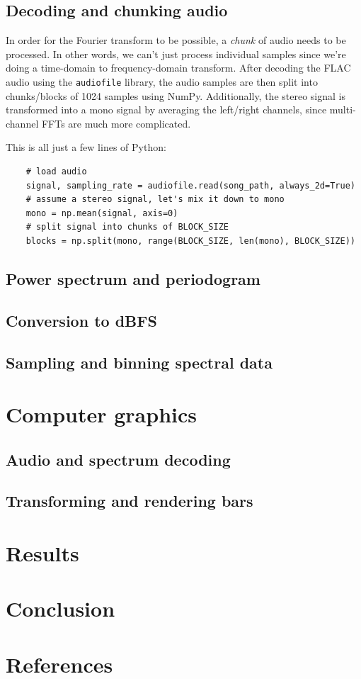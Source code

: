 \documentclass[11pt]{article}
\begin{document}
\subsection{Decoding and chunking audio}
In order for the Fourier transform to be possible, a \textit{chunk} of audio needs to be processed. In other
words, we can't just process individual samples since we're doing a time-domain to frequency-domain
transform. After decoding the FLAC audio using the \verb|audiofile| library, the audio samples are then split
into chunks/blocks of 1024 samples using NumPy. Additionally, the stereo signal is transformed into a mono
signal by averaging the left/right channels, since multi-channel FFTs are much more complicated.

This is all just a few lines of Python:
\begin{verbatim}
    # load audio
    signal, sampling_rate = audiofile.read(song_path, always_2d=True)
    # assume a stereo signal, let's mix it down to mono
    mono = np.mean(signal, axis=0)
    # split signal into chunks of BLOCK_SIZE
    blocks = np.split(mono, range(BLOCK_SIZE, len(mono), BLOCK_SIZE))
\end{verbatim}

\subsection{Power spectrum and periodogram}

\subsection{Conversion to dBFS}

\subsection{Sampling and binning spectral data}

\section{Computer graphics}
\subsection{Audio and spectrum decoding}

\subsection{Transforming and rendering bars}

\section{Results}

\section{Conclusion}

\section{References}
\printbibliography[heading=none]
\end{document}
